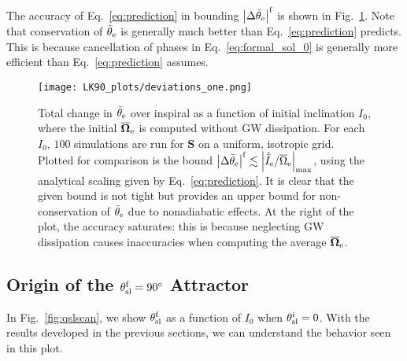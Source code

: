 \documentclass[
        twocolumn,
        twocolappendix
    ]{aastex63}
\newcommand*{\abs}[1]{\left|#1\right|}
\renewcommand*{\bm}[1]{\boldsymbol{\mathbf{#1}}}
\begin{document}
The accuracy of Eq.~\eqref{eq:prediction} in bounding $\abs{\Delta
\bar{\theta}_{\rm e}}^{\rm f}$ is shown in Fig.~\ref{fig:deviations}. Note that
conservation of $\bar{\theta}_{\rm e}$ is generally much better than
Eq.~\eqref{eq:prediction} predicts. This is because cancellation of phases in
Eq.~\eqref{eq:formal_sol_0} is generally more efficient than
Eq.~\eqref{eq:prediction} assumes.
\begin{figure}
    \centering
    \texttt{[image: LK90\_plots/deviations\_one.png]}
    \caption{Total change in $\bar{\theta}_{\rm e}$ over inspiral as a function of
    initial inclination $I_0$, where the initial $\bm{\overline{\Omega}}_{\rm
    e}$ is computed without GW dissipation. For each $I_0$, $100$ simulations
    are run for $\bm{S}$ on a uniform, isotropic grid. Plotted for comparison is
    the bound $\abs{\Delta \bar{\theta}_{\rm e}}^{\rm f} \lesssim
    \abs{\dot{\bar{I}}_{\rm e} /
    \overline{\Omega}_{\rm e}}_{\max}$, using the analytical scaling given by
    Eq.~\eqref{eq:prediction}. It is clear that the given bound is not tight but
    provides an upper bound for non-conservation of $\bar{\theta}_{\rm e}$ due to
    nonadiabatic effects. At the right of the plot, the accuracy saturates: this
    is because neglecting GW dissipation causes inaccuracies when computing the
    average $\bm{\overline{\Omega}}_{\rm e}$.}\label{fig:deviations}
\end{figure}

\subsection{Origin of the $\theta_{\rm sl}^{\rm f} = 90^\circ$ Attractor
}\label{eq:effect}

In Fig.~\ref{fig:qslscan}, we show $\theta_{\rm sl}^{\rm f}$ as a function of
$I_0$ when $\theta_{\rm sl}^{\rm i} = 0$. With the results developed in the
previous sections, we can understand the behavior seen in this plot.
\end{document}
